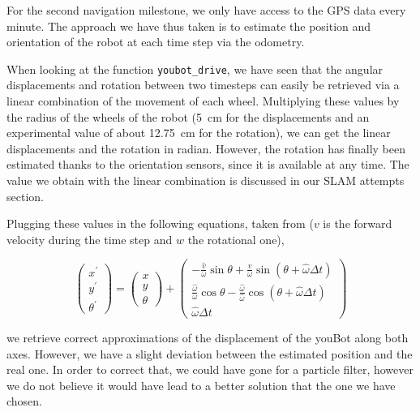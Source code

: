 \documentclass[a4paper, 10pt, conference]{ieeeconf}
\begin{document}
    For the second navigation milestone, we only have access to the GPS data every minute. The approach we have thus taken is to estimate the position and orientation of the robot at each time step via the odometry.
    
    When looking at the function \texttt{youbot\_drive}, we have seen that the angular displacements and rotation between two timesteps can easily be retrieved via a linear combination of the movement of each wheel. Multiplying these values by the radius of the wheels of the robot (\SI{5}{\centi\meter} for the displacements and an experimental value of about \SI{12.75}{\centi\meter} for the rotation), we can get the linear displacements and the rotation in radian. However, the rotation has finally been estimated thanks to the orientation sensors, since it is available at any time. The value we obtain with the linear combination is discussed in our SLAM attempts section. 
    
    Plugging these values in the following equations, taken from \cite{probaRobotics} ($v$ is the forward velocity during the time step and $w$ the rotational one),

    \begin{equation*}
        \left(\begin{array}{l}
            x^{\prime} \\ y^{\prime} \\ \theta^{\prime}
        \end{array}\right)
        =
        \left(\begin{array}{l}
            x \\ y \\ \theta
        \end{array}\right)
        +
        \left(\begin{array}{c}
            -\frac{\hat{v}}{\omega} \sin \theta+\frac{\hat{v}}{\omega} \sin (\theta+\hat{\omega} \Delta t) \\ \frac{\hat{\omega}}{\omega} \cos \theta-\frac{\hat{\omega}}{\hat{\omega}} \cos (\theta+\hat{\omega} \Delta t) \\ \hat{\omega} \Delta t
        \end{array}\right)
    \end{equation*}

    we retrieve correct approximations of the displacement of the youBot along both axes. However, we have a slight deviation between the estimated position and the real one. In order to correct that, we could have gone for a particle filter, however we do not believe it would have lead to a better solution that the one we have chosen.
    
\end{document}
